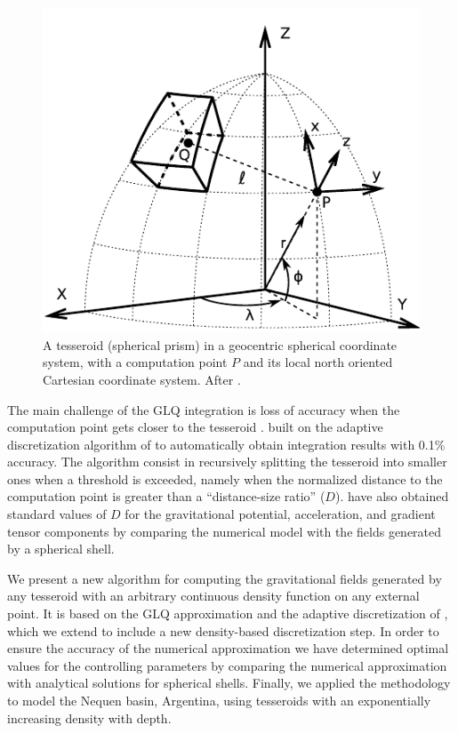 \documentclass[extra]{gji}
\begin{document}
\begin{figure}
\centering
\includegraphics[width=0.9\linewidth]{figures/tesseroid-uieda.pdf}
\caption{
    A tesseroid (spherical prism) in a geocentric spherical coordinate system, with a
    computation point $P$ and its local north oriented Cartesian coordinate system.
    After \citet{Uieda2015}.
}
\label{fig:tesseroid}
\end{figure}

The main challenge of the GLQ integration is loss of accuracy when the computation point
gets closer to the tesseroid \citep{Ku1977}.
\citet{Uieda2016} built on the adaptive discretization algorithm of \citet{Li2011}
to automatically obtain integration results with 0.1\% accuracy.
The algorithm consist in recursively splitting the tesseroid into smaller ones when a
threshold is exceeded,
namely when the normalized distance to the computation point is greater than a
``distance-size ratio'' ($D$).
\citet{Uieda2016} have also obtained standard values of $D$
for the gravitational potential, acceleration, and gradient tensor components
by comparing the numerical model with the fields generated by a spherical shell.

We present a new algorithm for computing the gravitational fields generated by any
tesseroid with an arbitrary continuous density function on any external point.
It is based on the GLQ approximation and the adaptive discretization of
\citep{Uieda2016}, which we extend to include a new density-based discretization step.
In order to ensure the accuracy of the numerical approximation we have
determined optimal values for the controlling parameters by
comparing the numerical approximation with analytical solutions for
spherical shells.
Finally, we applied the methodology to model the Nequen basin, Argentina, using
tesseroids with an exponentially increasing density with depth.
\end{document}
